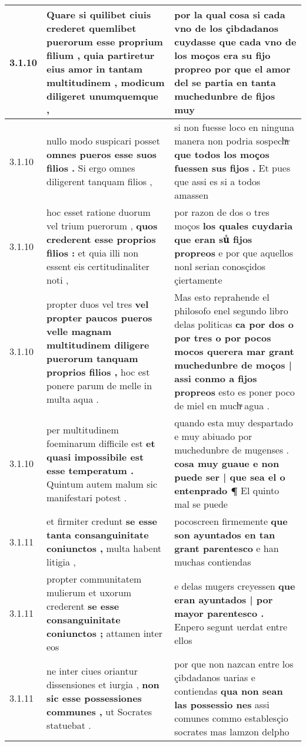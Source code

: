\begin{tabular}{|p{1cm}|p{6.5cm}|p{6.5cm}|}
3.1.10 & Quare si quilibet ciuis crederet \textbf{ quemlibet puerorum esse proprium filium , quia partiretur eius amor in tantam multitudinem , } modicum diligeret unumquemque , & por la qual cosa si cada vno de los çibdadanos cuydasse que cada vno de los moços era su fijo propreo \textbf{ por que el amor del se partia en tanta muchedunbre de fijos } muy \\\hline
3.1.10 & nullo modo suspicari posset \textbf{ omnes pueros esse suos filios . } Si ergo omnes diligerent tanquam filios , & si non fuesse loco en ninguna manera non podria sospechͣr \textbf{ que todos los moços fuessen sus fijos . } Et pues que assi es si a todos amassen \\\hline
3.1.10 & hoc esset ratione duorum vel trium puerorum , \textbf{ quos crederent esse proprios filios : } et quia illi non essent eis certitudinaliter noti , & por razon de dos o tres moços \textbf{ los quales cuydaria que eran suᷤ fijos propreos } e por que aquellos nonl serian conosçidos çiertamente \\\hline
3.1.10 & propter duos vel tres \textbf{ vel propter paucos pueros velle magnam multitudinem diligere puerorum tanquam proprios filios , } hoc est ponere parum de melle in multa aqua . & Mas esto reprahende el philosofo enel segundo libro delas politicas \textbf{ ca por dos o por tres o por pocos mocos querera mar grant muchedunbre de moços | assi conmo a fijos propreos } esto es poner poco de miel en muchͣ agua . \\\hline
3.1.10 & per multitudinem foeminarum difficile est \textbf{ et quasi impossibile est esse temperatum . } Quintum autem malum sic manifestari potest . & quando esta muy despartado e muy abiuado por muchedunbre de mugenses . \textbf{ cosa muy guaue e non puede ser | que sea el o entenprado ¶ } El quinto mal se puede \\\hline
3.1.11 & et firmiter credunt \textbf{ se esse tanta consanguinitate coniunctos , } multa habent litigia , & pocoscreen firmemente \textbf{ que son ayuntados en tan grant parentesco } e han muchas contiendas \\\hline
3.1.11 & propter communitatem mulierum et uxorum crederent \textbf{ se esse consanguinitate coniunctos ; } attamen inter eos & e delas mugers creyessen \textbf{ que eran ayuntados | por mayor parentesco . } Enpero segunt uerdat entre ellos \\\hline
3.1.11 & ne inter ciues oriantur dissensiones et iurgia , \textbf{ non sic esse possessiones communes , } ut Socrates statuebat . & por que non nazcan entre los çibdadanos uarias e contiendas \textbf{ qua non sean las possessio nes } assi comunes commo establesçio socrates mas lamzon delpho \\\hline

\end{tabular}
